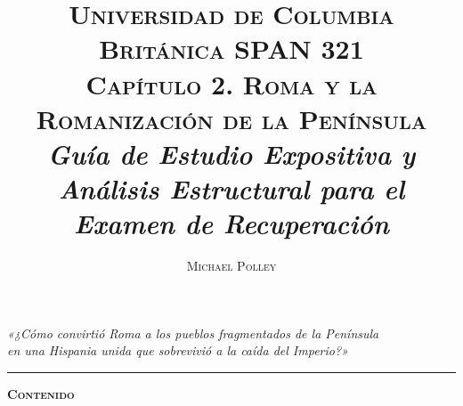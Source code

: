 \documentclass[11pt,letterpaper]{article}
\title{%
  \vspace{-1.2em}
  {\normalsize\scshape\color{goodingSlate} Universidad de Columbia Británica \quad\textbullet\quad SPAN 321}\\[0.5em]
  {\LARGE\bfseries\scshape Capítulo 2. Roma y la Romanización de la Península}\\[0.35em]
  {\large\itshape Guía de Estudio Expositiva y Análisis Estructural para el Examen de Recuperación}
}
\author{\normalsize\scshape Michael Polley}
\date{}
\begin{document}
\maketitle
\vspace{-1.8em}

\begin{center}
  \parbox{0.9\linewidth}{%
    \centering\itshape\small
    «¿Cómo convirtió Roma a los pueblos fragmentados de la Península\\
    en una Hispania unida que sobrevivió a la caída del Imperio?»
  }
\end{center}

\vspace{0.4em}
\noindent\rule{\linewidth}{0.4pt}

\begin{center}
  {\Large\bfseries\scshape Contenido}
\end{center}
\vspace{0.3em}
\end{document}
